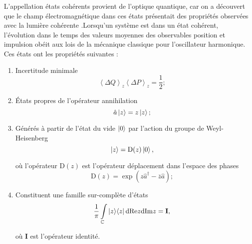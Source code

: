 \documentclass[a4paper, 11pt]{article}
\newcommand{\opr}[1]{\hat{#1}}
\newcommand{\diff}{\mathrm{d}}
\begin{document}
	\noindent
	L’appellation états cohérents provient de l’optique quantique, car on a découvert que le champ électromagnétique dans ces états présentait des propriétés observées avec la lumière cohérente .Lorsqu’un système est dans un état cohérent, l’évolution dans le temps des valeurs moyennes des observables position et impulsion obéit aux lois de la mécanique classique pour l’oscillateur harmonique. Ces états ont les propriétés suivantes :
	
	\begin{enumerate}
	    \item Incertitude minimale
    	    \begin{equation} \label{eq/9}
    	        \left<\Delta Q\right>_z \left<\Delta P\right>_z = \frac{1}{2};
    	    \end{equation}
    	    
        \item États propres de l’opérateur annihilation
            \begin{equation} \label{eq/10}
                \opr{a} \ket{z} = z \ket{z};
            \end{equation}
            
        \item Générés à partir de l’état du vide $\ket{0}$ par l’action du groupe de Weyl-Heisenberg
            \begin{equation} \label{eq/11}
                \ket{z} = \mathrm{D}(z) \ket{0},
            \end{equation}
            
            \noindent
            où l’opérateur $\mathrm{D}(z)$ est l’opérateur déplacement dans l’espace des phases
	        \begin{equation} \label{eq/12}
                \mathrm{D}(z) = \exp \left(z \opr{a}^\dagger - \overline{z} \opr{a}\right);
            \end{equation}
            
        \item Constituent une famille sur-complète d’états
            \begin{equation} \label{eq/13}
                \frac{1}{\pi} \int\limits_{\mathbb{C}} \ket{z}\!\bra{z} \diff\!\Re\!z\diff\!\Im\!z = \mathbf{I},
            \end{equation}
            
            \noindent
            où $\mathbf{I}$ est l’opérateur identité.
	    
	\end{enumerate}

    
\end{document}
